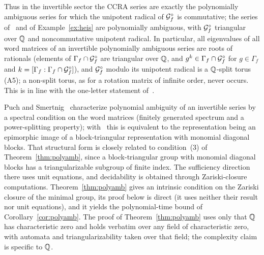 Thus in the invertible sector the CCRA series are exactly the polynomially ambiguous series for which
the unipotent radical of $\mathcal{G}_f^\circ$ is commutative; the series of~\cite[Example~17]{MPSfull} and of
Example~\ref{ex:heis} are polynomially ambiguous, with $\mathcal{G}_f^\circ$ triangular over $\mathbb{Q}$ and
noncommutative unipotent radical. In particular, all eigenvalues of all word matrices of an
invertible polynomially ambiguous series are roots of rationals (elements of
$\Gamma_f\cap\mathcal{G}_f^\circ$ are triangular over $\mathbb{Q}$, and $g^k\in\Gamma_f\cap\mathcal{G}_f^\circ$ for
$g\in\Gamma_f$ and $k=[\Gamma_f:\Gamma_f\cap\mathcal{G}_f^\circ]$), and $\mathcal{G}_f^\circ$ modulo its unipotent radical
is a $\mathbb{Q}$-split torus (A5); a non-split torus, as for a rotation matrix of infinite order, never occurs.
This is in line with the one-letter statement of~\cite{BFLM22}.

\begin{remark}\label{rem:polyamb-ps}
Puch and Smertnig~\cite[Theorem~1.6]{PS24} characterize polynomial ambiguity of an invertible
series by a spectral condition on the word matrices (finitely generated spectrum and a
power-splitting property); with~\cite[Theorem~1.3, Proposition~9.4]{PS24} this is equivalent to the
representation being an epimorphic image of a block-triangular representation with monomial diagonal
blocks. That structural form is closely related to condition~(3) of Theorem~\ref{thm:polyamb}, since a
block-triangular group with monomial diagonal blocks has a triangularizable subgroup of finite index.
The sufficiency direction there uses unit equations, and decidability is obtained through
Zariski-closure computations. Theorem~\ref{thm:polyamb} gives an intrinsic condition on the Zariski
closure of the minimal group, its proof below is direct (it uses neither their result nor unit
equations), and it yields the polynomial-time bound of Corollary~\ref{cor:polyamb}. The proof of Theorem~\ref{thm:polyamb}
uses only that $\mathbb{Q}$ has characteristic zero and holds verbatim over any field of characteristic zero,
with automata and triangularizability taken over that field; the complexity claim is specific to $\mathbb{Q}$.
\end{remark}


